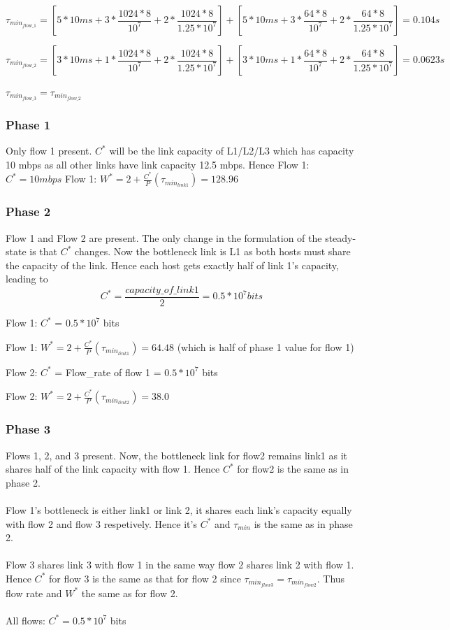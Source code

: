 \documentclass[12pt]{article}
\begin{document}
$$\tau_{min_{flow\_1}} = [5*10 ms + 3*\frac{1024*8}{10^7} + 2*\frac{1024*8}{1.25*10^7}] + [5*10 ms + 3*\frac{64*8}{10^7} + 2*\frac{64*8}{1.25*10^7}] = 0.104 s$$ 

$$\tau_{min_{flow\_2}} = [3 * 10 ms + 1*\frac{1024*8}{10^7} + 2*\frac{1024*8}{1.25*10^7}] + [3*10 ms + 1*\frac{64*8}{10^7} + 2*\frac{64*8}{1.25*10^7}] = 0.0623 s$$ 

$\tau_{min_{flow\_3}} = \tau_{min_{flow\_2}}$



\subsubsection*{Phase 1}
Only flow 1 present. $C^*$ will be the link capacity of L1/L2/L3 which has capacity 10 mbps as all other links have link capacity 12.5 mbps. Hence 
Flow 1: $C^* = 10 mbps$
Flow 1: $W^* = 2 + \frac{C^*}{P}(\tau_{min_{link1}})=128.96 $

\subsubsection*{Phase 2}
Flow 1 and Flow 2 are present. The only change in the formulation of the steady-state is that $C^*$ changes. Now the bottleneck link is L1 as both hosts must share the capacity of the link. Hence each host gets exactly half of link 1's capacity, leading to $$ C^* = \frac{capacity\_of\_link1}{2} = 0.5*10^7 bits $$

Flow 1: $C^*$ = $0.5*10^7$ bits

Flow 1: $W^* = 2+\frac{C^*}{P}(\tau_{min_{link1}}) = 64.48$ (which is half of phase 1 value for flow 1)

Flow 2: $C^*$ = Flow\_rate of flow 1 = $0.5*10^7$ bits

Flow 2: $W^* = 2+\frac{C^*}{P}(\tau_{min_{link2}}) = 38.0$


\subsubsection*{Phase 3}
Flows 1, 2, and 3 present. Now, the bottleneck link for flow2 remains link1 as it shares half of the link capacity with flow 1. Hence $C^*$ for flow2 is the same as in phase 2.
\\\\
Flow 1's bottleneck is either link1 or link 2, it shares each link's capacity equally with flow 2 and flow 3 respetively. Hence it's $C^*$ and $\tau_{min}$ is the same as in phase 2.
\\\\
Flow 3 shares link 3 with flow 1 in the same way flow 2 shares link 2 with flow 1. Hence $C^*$ for flow 3 is the same as that for flow 2 since $\tau_{min_{flow3}}=\tau_{min_{flow2}}$. Thus flow rate and $W^*$ the same as for flow 2.
\\\\
All flows: $C^* = 0.5*10^7$ bits
\end{document}

